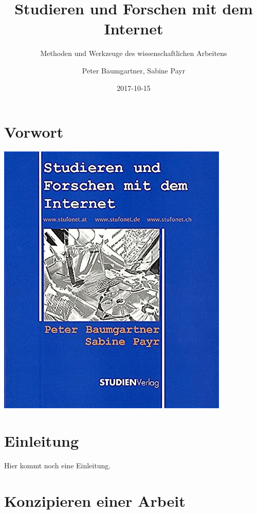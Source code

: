\documentclass[]{book}
\title{Studieren und Forschen mit dem Internet}
\subtitle{Methoden und Werkzeuge des wissenschaftlichen Arbeitens}
\author{Peter Baumgartner, Sabine Payr}
\date{2017-10-15}
\theoremstyle{definition}
\theoremstyle{definition}
\theoremstyle{definition}
\theoremstyle{remark}
\begin{document}
\maketitle

{
\hypersetup{linkcolor=black}
\setcounter{tocdepth}{2}
\tableofcontents
}
\chapter*{Vorwort}\label{vorwort}

\begin{center}\href{http://www.studienverlag.at/page.cfm?vpath=buecher/buchdetail&titnr=1319}{\includegraphics{images/cover-stufonet-min} }\end{center}

\chapter*{Einleitung}\label{einleitung}

Hier kommt noch eine Einleitung.

\hypertarget{konzipieren}{\chapter{Konzipieren einer
Arbeit}\label{konzipieren}}
\end{document}
